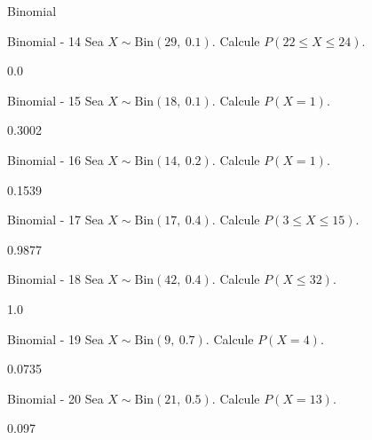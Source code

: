 \documentclass[a4,11pt]{aleph-notas}
\newcommand{\Bin}{\text{Bin}}
\begin{document}
\begin{quiz}{Binomial}
\begin{numerical}[tolerance=0.001]%
    {Binomial - 14}
    Sea \( X \sim \Bin(29,\ 0.1) \). Calcule \( P(22 \leq X \leq 24) \).
    \item[] 0.0
\end{numerical}

\begin{numerical}[tolerance=0.001]%
    {Binomial - 15}
    Sea \( X \sim \Bin(18,\ 0.1) \). Calcule \( P(X = 1) \).
    \item[] 0.3002
\end{numerical}

\begin{numerical}[tolerance=0.001]%
    {Binomial - 16}
    Sea \( X \sim \Bin(14,\ 0.2) \). Calcule \( P(X = 1) \).
    \item[] 0.1539
\end{numerical}

\begin{numerical}[tolerance=0.001]%
    {Binomial - 17}
    Sea \( X \sim \Bin(17,\ 0.4) \). Calcule \( P(3 \leq X \leq 15) \).
    \item[] 0.9877
\end{numerical}

\begin{numerical}[tolerance=0.001]%
    {Binomial - 18}
    Sea \( X \sim \Bin(42,\ 0.4) \). Calcule \( P(X \leq 32) \).
    \item[] 1.0
\end{numerical}

\begin{numerical}[tolerance=0.001]%
    {Binomial - 19}
    Sea \( X \sim \Bin(9,\ 0.7) \). Calcule \( P(X = 4) \).
    \item[] 0.0735
\end{numerical}

\begin{numerical}[tolerance=0.001]%
    {Binomial - 20}
    Sea \( X \sim \Bin(21,\ 0.5) \). Calcule \( P(X = 13) \).
    \item[] 0.097
\end{numerical}


\end{quiz}
\end{document}
